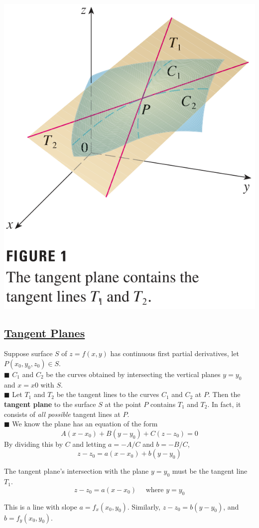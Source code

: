 \documentclass{article}
\begin{document}
\begin{minipage}[b]{0.34\linewidth}
  \begin{center}
    \includegraphics[width = 4.3 cm]{./images/tangentplane.png} 
  \end{center}
  
\end{minipage}
\begin{minipage}[b]{0.63\linewidth}
  \subsection*{{\selectfont \underline{Tangent Planes}}}
  Suppose surface $S$ of $z = f(x,y)$ has continuous first partial derivatives, let $P(x _ 0,  y _ 0, z _ 0 ) \in S$. \\
  \textcolor{blue5}{$\blacksquare$} $C _ 1 $ and $C _ 2 $ be the curves obtained by intersecting the vertical planes $y = y _ 0 $ and $ x = x0 $ with $S $.\\
 \textcolor{blue5}{$\blacksquare$} Let $T _ 1 $  and $T _ 2 $ be the tangent lines to the curves  $C _ 1 $ and $ C _ 2$ at $P$. 
 Then the \textbf{tangent plane} to the surface $S $ at the point $P $ contains $T _ 1 $ and $T _ 2 $. In fact, it consists of \textit{all possible} tangent lines at $P $.\\
\textcolor{blue5}{$\blacksquare$} We know the plane has an equation of the form 
\[A(x - x _ 0) + B(y - y _ 0) + C(z - z _ 0 ) = 0 \]
By dividing this by $C $ and letting $a = -A/C $ and $b = -B/C $, 
\[z - z _ 0 =  a(x - x _ 0 ) + b (y - y _ 0 )\]
\end{minipage}

The tangent plane's intersection with the plane $y = y _ 0 $ must be the tangent line $T _ 1 $.
\[z - z _ 0 = a(x - x _ 0 ) \quad \text{ where } y = y _ 0\]

This is a line with slope $a = f _ x (x _ 0, y _ 0  )$. Similarly, $z - z _ 0 = b ( y - y _ 0 )$, and $b = f _ y (x _ 0, y _ 0 )$.
\end{document}
